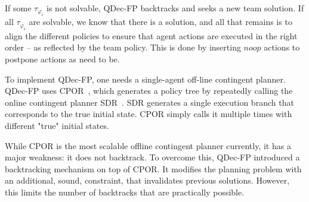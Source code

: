 \documentclass[letterpaper]{article} %
\theoremstyle{definition}
\begin{document}
If some $\tau_{\varphi_i}$ is not solvable, QDec-FP backtracks and seeks a new team solution.
If all $\tau_{\varphi_i}$ are solvable, we know that there is a solution, and all that remains is to align the different policies to ensure that agent actions are executed in the right order -- as reflected by the team policy. This is done by inserting $noop$ actions to postpone actions as need to be.

To implement QDec-FP,
one needs a single-agent off-line contingent planner. 
QDec-FP uses CPOR~\citep{CPOR}, which generates a policy tree by repeatedly calling the online contingent planner SDR~\citep{SDR}. SDR generates a single execution branch that corresponds to the true initial state. CPOR
simply calls it multiple times with different "true" initial states.

While CPOR is the most scalable offline contingent planner currently, it has a major weakness: it does not backtrack. 
To overcome this, QDec-FP introduced a backtracking mechanism on top of CPOR. It modifies the planning problem with an additional, sound, constraint, that invalidates
previous solutions. 
However, this limits the number of backtracks that are practically possible. 
%


\end{document}
